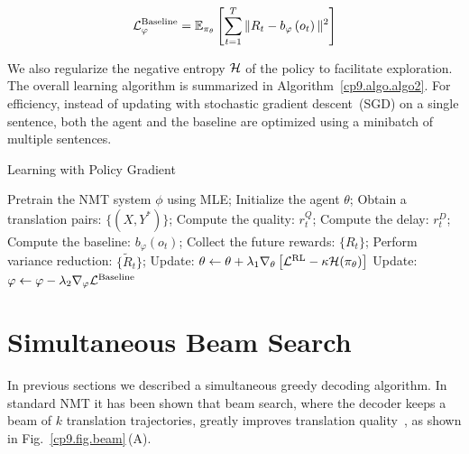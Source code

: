 \begin{equation}
   \mathcal{L}^{\text{Baseline}}_{\varphi} = \mathbb{E}_{\pi_{\theta}}\left[ \sum_{t=1}^T\|R_t - b_{\varphi}\left(o_t\right)\|^2 \right]
\end{equation}

We also regularize the negative entropy $\mathcal{H}$ of  the policy 
to facilitate exploration. 
The overall learning algorithm is summarized in Algorithm~\ref{cp9.algo.algo2}. For efficiency, instead of updating with stochastic gradient descent~(SGD) on a single sentence, both the agent and the baseline are optimized using 
a minibatch of multiple sentences.

\begin{algorithm}[t]
\caption{Learning with Policy Gradient}
\label{cp9.algo.algo2}
\begin{algorithmic}[1]
{}
\State Pretrain the NMT system $\phi$ using MLE;
\State Initialize the agent $\theta$;
\State Obtain a translation pairs: $\{(X, Y^*)\}$;
\State Compute the quality: $r_t^Q$;
\State Compute the delay: $r_t^D$;
\State Compute the baseline: $b_{\varphi}\left(o_t\right)$;
\EndFor
\EndFor
\State Collect the future rewards: $\{R_t\}$;
\State Perform variance reduction: $\{\tilde{R}_t\}$;
\State Update: $\theta \gets \theta + \lambda_1 \nabla_{\theta}\left[\mathcal{L}^{\text{RL}} - \kappa\mathcal{H}(\pi_{\theta})\right]$
\State Update: $\varphi \gets \varphi - \lambda_2 \nabla_{\varphi}\mathcal{L}^{\text{Baseline}}$
\EndWhile
\end{algorithmic}
\end{algorithm}


\section{Simultaneous Beam Search}
\label{cp9.sec.beamsearch}

In previous sections we described a simultaneous greedy decoding algorithm. In standard NMT it has been shown that beam search, where the decoder keeps a beam of $k$ translation trajectories, greatly improves translation quality~\cite{sutskever2014sequence}, as shown in Fig.~\ref{cp9.fig.beam}\,(A). 

